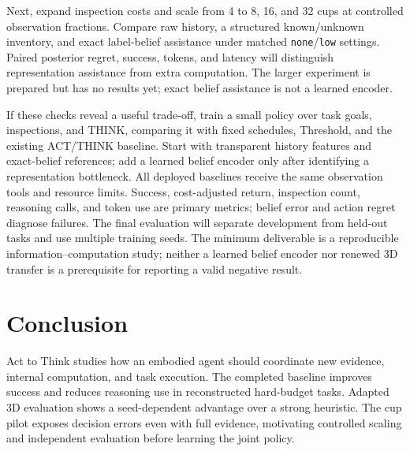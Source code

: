 \documentclass[conference]{IEEEtran}
\begin{document}
Next, expand inspection costs and scale from 4 to 8, 16, and 32 cups at controlled observation fractions. Compare raw history, a structured known/unknown inventory, and exact label-belief assistance under matched \texttt{none}/\texttt{low} settings. Paired posterior regret, success, tokens, and latency will distinguish representation assistance from extra computation. The larger experiment is prepared but has no results yet; exact belief assistance is not a learned encoder.

If these checks reveal a useful trade-off, train a small policy over task goals, inspections, and THINK, comparing it with fixed schedules, Threshold, and the existing ACT/THINK baseline. Start with transparent history features and exact-belief references; add a learned belief encoder only after identifying a representation bottleneck. All deployed baselines receive the same observation tools and resource limits. Success, cost-adjusted return, inspection count, reasoning calls, and token use are primary metrics; belief error and action regret diagnose failures. The final evaluation will separate development from held-out tasks and use multiple training seeds. The minimum deliverable is a reproducible information--computation study; neither a learned belief encoder nor renewed 3D transfer is a prerequisite for reporting a valid negative result.

\section{Conclusion}
Act to Think studies how an embodied agent should coordinate new evidence, internal computation, and task execution. The completed baseline improves success and reduces reasoning use in reconstructed hard-budget tasks. Adapted 3D evaluation shows a seed-dependent advantage over a strong heuristic. The cup pilot exposes decision errors even with full evidence, motivating controlled scaling and independent evaluation before learning the joint policy.



\end{document}
